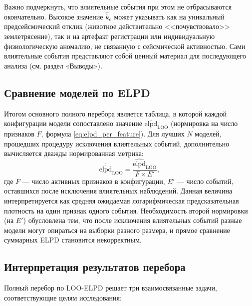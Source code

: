 \documentclass[14pt]{mmcs_article}
\begin{document}
	Важно подчеркнуть, что влиятельные события при этом не
	отбрасываются окончательно. Высокое значение $\hat{k}_e$
	может указывать как на уникальный предсейсмический отклик
	(животное действительно <<почувствовало>> землетрясение),
	так и на артефакт регистрации или индивидуальную
	физиологическую аномалию, не связанную с сейсмической
	активностью. Сами влиятельные события представляют собой
	ценный материал для последующего анализа (см. раздел
	«Выводы»).
	
	\subsection*{Сравнение моделей по ELPD}
	
	Итогом основного полного перебора является таблица, в которой
	каждой конфигурации модели сопоставлено значение
	$\overline{\mathrm{elpd}}_{\mathrm{LOO}}$ (нормировка на число
	признаков $F$, формула \eqref{eq:elpd_per_feature}). Для
	лучших $N$ моделей, прошедших процедуру исключения
	влиятельных событий, дополнительно вычисляется дважды
	нормированная метрика:
	\begin{equation}\label{eq:elpd_fully_normalized}
		\overline{\overline{\mathrm{elpd}}}_{\mathrm{LOO}} = 
		\frac{\widehat{\mathrm{elpd}}_{\mathrm{LOO}}}{F \times E'},
	\end{equation}
	где $F$ — число активных признаков в конфигурации, $E'$ — число
	событий, оставшихся после исключения влиятельных наблюдений.
	Данная величина интерпретируется как средняя ожидаемая
	логарифмическая предсказательная плотность на один признак
	одного события. Необходимость второй нормировки (на $E'$)
	обусловлена тем, что после исключения влиятельных событий
	разные модели могут опираться на выборки разного размера, и
	прямое сравнение суммарных ELPD становится некорректным.
	
	\subsection*{Интерпретация результатов перебора}
	
	Полный перебор по LOO-ELPD решает три взаимосвязанные задачи,
	соответствующие целям исследования:
	
\end{document}
